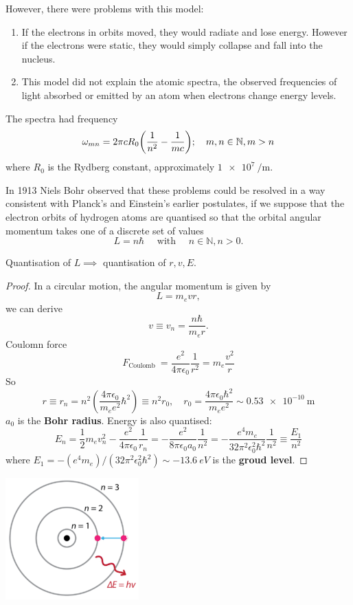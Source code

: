 \documentclass[a4paper]{article}
\begin{document}
However, there were problems with this model:
\begin{enumerate}
	\item If the electrons in orbits moved, they would radiate and lose energy.
	      However if the electrons were static, they would simply collapse and fall into the nucleus.
	\item This model did not explain the atomic spectra, the observed frequencies of light absorbed or emitted by an atom when electrons change energy levels.
\end{enumerate}
The spectra had frequency
\[
	\omega_{mn} = 2 \pi c R_0 \qty(\frac{1}{n^2} - \frac{1}{mc}); \quad m, n \in \mathbb N, m > n
\]
where \( R_0 \) is the Rydberg constant, approximately \( \SI{1e7}{\per\metre} \).

In 1913 Niels Bohr observed that these problems could be resolved in a way consistent with Planck's and Einstein's earlier postulates, if we suppose that the electron orbits of hydrogen atoms are quantised so that the orbital angular momentum takes one of a discrete set of values
\[
L=n \hbar \quad \text { with } \quad n \in \mathbb{N}, n>0 .
\]
\begin{proposition}
    Quantisation of $L \implies $ quantisation of $r,v,E$. 
\end{proposition}
\begin{proof}
    In a circular motion, the angular momentum is given by
\[
L=m_e v r,
\]
we can derive
\[
v \equiv v_n=\frac{n \hbar}{m_e r} .
\]
Coulomn force 
\[
    F_{\text {Coulomb }}=\frac{e^2}{4 \pi \epsilon_0} \frac{1}{r^2}=m_e \frac{v^2}{r} 
\]
So 
\[
    r \equiv r_n=n^2\left(\frac{4 \pi \epsilon_0}{m_e e^2} \hbar^2\right) \equiv n^2 r_0, \quad
        r_0=\frac{4 \pi \epsilon_0 \hbar^2}{m_e e^2} \sim \SI{0.53e-10}{\metre}
\]
$a_0$ is the \textbf{Bohr radius}. Energy is also quantised: 
\[
    E_n=\frac{1}{2} m_e v_n^2-\frac{e^2}{4 \pi \epsilon_0} \frac{1}{r_n}=-\frac{e^2}{8 \pi \epsilon_0 a_0} \frac{1}{n^2}=-\frac{e^4 m_e}{32 \pi^2 \epsilon_0^2 \hbar^2} \frac{1}{n^2} \equiv \frac{E_1}{n^2}
\]
where $ E_1=-\left(e^4 m_e\right) /\left(32 \pi^2 \epsilon_0^2 \hbar^2\right) \sim \SI{-13.6}{eV} $ is the \textbf{groud level}. 
\end{proof}

\begin{center}
    \includegraphics[scale=0.5]{qm6.png}
\end{center}
\end{document}
